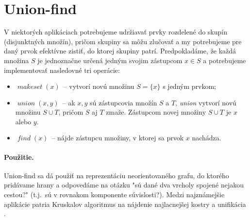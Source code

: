 \def\null{\texttt{NULL}}
\def\makeset{$\mathop{\mathit{makeset}}(x)$}
\def\find{$\mathop{\mathit{find}}(x)$}
\def\union{$\mathop{\mathit{union}}(x, y)$}

\section{Union-find}

V niektorých aplikáciach potrebujeme udržiavať prvky rozdelené do skupín
(disjunktných množín), pričom skupiny sa môžu zlučovať a my potrebujeme
pre daný prvok efektívne zistiť, do ktorej skupiny patrí. Predpokladáme,
že každá množina $S$ je jednoznačne určená jedným svojim zástupcom $x\in S$
a potrebujeme implementovať nasledovné tri operácie:

\begin{itemize}
\item \makeset\ -- vytvorí novú množinu $S=\{x\}$ s jedným prvkom; %
\item \union\ -- ak $x,y$ sú zástupcovia množín $S$ a $T$,
                 {\it union} vytvorí novú množinu $S\cup T$,
                 pričom $S$ aj $T$ zmaže. Zástupcom novej množiny $S\cup T$
                 je $x$ alebo $y$.
\item \find\ -- nájde zástupcu množiny, v ktorej sa 
                prvok $x$ nachádza.
\end{itemize}



\paragraph{Použitie.}

Union-find sa dá použiť na reprezentáciu neorientovaného grafu,
do ktorého pridávame hrany a odpovedáme na otázku "sú dané dva
vrcholy spojené nejakou cestou?" (t.j.\ sú v rovnakom komponente súvislosti?).
Medzi najznámejšie aplikácie patria Kruskalov algoritmus na nájdenie najlacnejšej
kostry \citep{kruskal} a unifikácia \citep{unif}.

